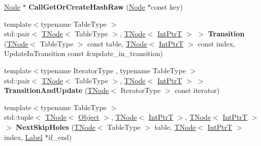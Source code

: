 \begin{DoxyCompactItemize}
\mbox{\label{classv8_1_1internal_1_1CollectionsBuiltinsAssembler_adaf645c5642b81c2d503153cfd858e5d}} 
\mbox{\hyperlink{classv8_1_1internal_1_1compiler_1_1Node}{Node}} $\ast$ {\bfseries Call\+Get\+Or\+Create\+Hash\+Raw} (\mbox{\hyperlink{classv8_1_1internal_1_1compiler_1_1Node}{Node}} $\ast$const key)
\item 
\mbox{\label{classv8_1_1internal_1_1CollectionsBuiltinsAssembler_aab0b8f3ac438737e5ea1ba60dcc571ee}} 
{\footnotesize template$<$typename Table\+Type $>$ }\\std\+::pair$<$ \mbox{\hyperlink{classv8_1_1internal_1_1compiler_1_1TNode}{T\+Node}}$<$ Table\+Type $>$, \mbox{\hyperlink{classv8_1_1internal_1_1compiler_1_1TNode}{T\+Node}}$<$ \mbox{\hyperlink{structv8_1_1internal_1_1IntPtrT}{Int\+PtrT}} $>$ $>$ {\bfseries Transition} (\mbox{\hyperlink{classv8_1_1internal_1_1compiler_1_1TNode}{T\+Node}}$<$ Table\+Type $>$ const table, \mbox{\hyperlink{classv8_1_1internal_1_1compiler_1_1TNode}{T\+Node}}$<$ \mbox{\hyperlink{structv8_1_1internal_1_1IntPtrT}{Int\+PtrT}} $>$ const index, Update\+In\+Transition const \&update\+\_\+in\+\_\+transition)
\item 
\mbox{\label{classv8_1_1internal_1_1CollectionsBuiltinsAssembler_a54f211a28df63475a3f809529b79af9e}} 
{\footnotesize template$<$typename Iterator\+Type , typename Table\+Type $>$ }\\std\+::pair$<$ \mbox{\hyperlink{classv8_1_1internal_1_1compiler_1_1TNode}{T\+Node}}$<$ Table\+Type $>$, \mbox{\hyperlink{classv8_1_1internal_1_1compiler_1_1TNode}{T\+Node}}$<$ \mbox{\hyperlink{structv8_1_1internal_1_1IntPtrT}{Int\+PtrT}} $>$ $>$ {\bfseries Transition\+And\+Update} (\mbox{\hyperlink{classv8_1_1internal_1_1compiler_1_1TNode}{T\+Node}}$<$ Iterator\+Type $>$ const iterator)
\item 
\mbox{\label{classv8_1_1internal_1_1CollectionsBuiltinsAssembler_a9a00ababf48e6cf754983c4d4003f61e}} 
{\footnotesize template$<$typename Table\+Type $>$ }\\std\+::tuple$<$ \mbox{\hyperlink{classv8_1_1internal_1_1compiler_1_1TNode}{T\+Node}}$<$ \mbox{\hyperlink{classv8_1_1internal_1_1Object}{Object}} $>$, \mbox{\hyperlink{classv8_1_1internal_1_1compiler_1_1TNode}{T\+Node}}$<$ \mbox{\hyperlink{structv8_1_1internal_1_1IntPtrT}{Int\+PtrT}} $>$, \mbox{\hyperlink{classv8_1_1internal_1_1compiler_1_1TNode}{T\+Node}}$<$ \mbox{\hyperlink{structv8_1_1internal_1_1IntPtrT}{Int\+PtrT}} $>$ $>$ {\bfseries Next\+Skip\+Holes} (\mbox{\hyperlink{classv8_1_1internal_1_1compiler_1_1TNode}{T\+Node}}$<$ Table\+Type $>$ table, \mbox{\hyperlink{classv8_1_1internal_1_1compiler_1_1TNode}{T\+Node}}$<$ \mbox{\hyperlink{structv8_1_1internal_1_1IntPtrT}{Int\+PtrT}} $>$ index, \mbox{\hyperlink{classv8_1_1internal_1_1compiler_1_1CodeAssemblerLabel}{Label}} $\ast$if\+\_\+end)

\end{DoxyCompactItemize}
